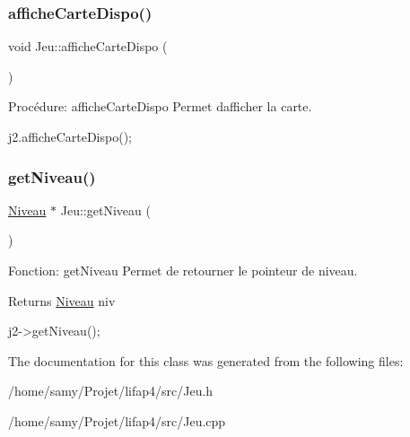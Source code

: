 \subsubsection{\texorpdfstring{affiche\+Carte\+Dispo()}{afficheCarteDispo()}}
{\footnotesize\ttfamily void Jeu\+::affiche\+Carte\+Dispo (\begin{DoxyParamCaption}{ }\end{DoxyParamCaption})}



Procédure\+: affiche\+Carte\+Dispo Permet d\textquotesingle{}afficher la carte. 


\begin{DoxyCode}
j2.afficheCarteDispo();
\end{DoxyCode}
 \mbox{\label{classJeu_a71bf0b5329ade330d95318b50d1e2f12}} 
\subsubsection{\texorpdfstring{get\+Niveau()}{getNiveau()}}
{\footnotesize\ttfamily \hyperlink{classNiveau}{Niveau} $\ast$ Jeu\+::get\+Niveau (\begin{DoxyParamCaption}{ }\end{DoxyParamCaption})}



Fonction\+: get\+Niveau Permet de retourner le pointeur de niveau. 

\begin{DoxyReturn}{Returns}
\hyperlink{classNiveau}{Niveau} niv 
\begin{DoxyCode}
j2->getNiveau();
\end{DoxyCode}
 
\end{DoxyReturn}


The documentation for this class was generated from the following files\+:\begin{DoxyCompactItemize}
\item 
/home/samy/\+Projet/lifap4/src/Jeu.\+h\item 
/home/samy/\+Projet/lifap4/src/Jeu.\+cpp\end{DoxyCompactItemize}
